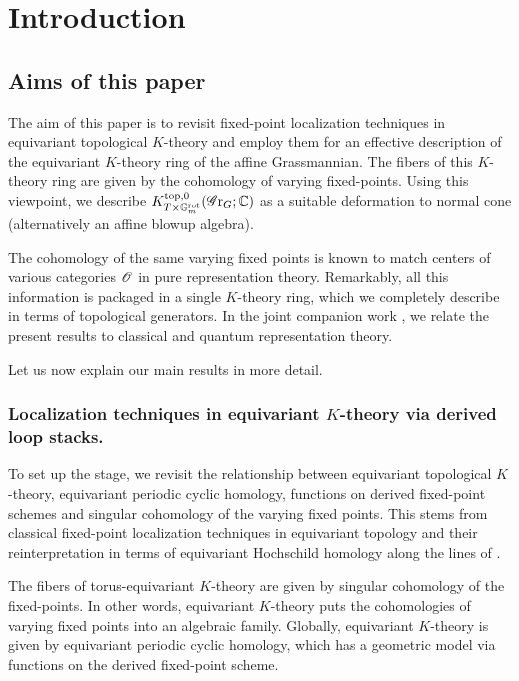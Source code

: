 \section{Introduction}\label{section: introduction}


\subsection{Aims of this paper}

The aim of this paper is to revisit fixed-point localization techniques in equivariant topological $K$-theory and employ them for an effective description of the equivariant $K$-theory ring of the affine Grassmannian. The fibers of this $K$-theory ring are given by the cohomology of varying fixed-points. Using this viewpoint, we describe $K^{\mathrm{top}, 0}_{T \times \mathbb{G}_m^{\mathrm{rot}}}(\operatorname{\mathscr{G}r}_G; \operatorname{\mathbb{C}})$ as a suitable deformation to normal cone (alternatively an affine blowup algebra).


The cohomology of the same varying fixed points is known to match centers of various categories $\operatorname{\mathscr{O}}$ in pure representation theory. Remarkably, all this information is packaged in a single $K$-theory ring, which we completely describe in terms of topological generators. In the joint companion work \cite{HL25}, we relate the present results to classical and quantum representation theory.



Let us now explain our main results in more detail.

\subsubsection{Localization techniques in equivariant $K$-theory via derived loop stacks.}

To set up the stage, we revisit the relationship between equivariant topological $K$-theory, equivariant periodic cyclic homology, functions on derived fixed-point schemes and singular cohomology of the varying fixed points. This stems from classical fixed-point localization techniques in equivariant topology and their reinterpretation in terms of equivariant Hochschild homology along the lines of \cite{Chen20}.


\begin{motto}
The fibers of torus-equivariant $K$-theory are given by singular cohomology of the fixed-points. In other words, equivariant $K$-theory puts the cohomologies of varying fixed points into an algebraic family. Globally, equivariant $K$-theory is given by equivariant periodic cyclic homology, which has a geometric model via functions on the derived fixed-point scheme.  
\end{motto}

